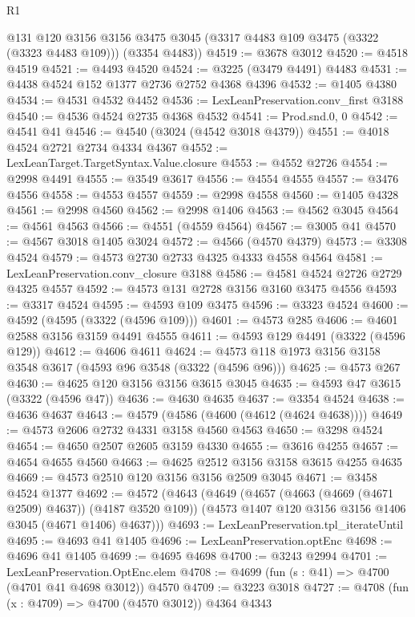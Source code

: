 \begin{lexlean}{R1}
\begin{coremodule}
      @131
      @120
      @3156
      @3156
      @3475
      @3045
      (@3317 @4483 @109 @3475 (@3322 (@3323 @4483 @109)))
      (@3354 @4483))
@4519 := @3678 @3012
@4520 := @4518 @4519
@4521 := @4493 @4520
@4524 := @3225 (@3479 @4491) @4483
@4531 := @4438 @4524 @152 @1377 @2736 @2752 @4368 @4396
@4532 := @1405 @4380
@4534 := @4531 @4532 @4452
@4536 := LexLeanPreservation.conv_first @3188
@4540 := @4536 @4524 @2735 @4368 @4532
@4541 := Prod.snd.{0, 0}
@4542 := @4541 @41
@4546 := @4540 (@3024 (@4542 @3018 @4379))
@4551 := @4018 @4524 @2721 @2734 @4334 @4367
@4552 := LexLeanTarget.TargetSyntax.Value.closure
@4553 := @4552 @2726
@4554 := @2998 @4491
@4555 := @3549 @3617
@4556 := @4554 @4555
@4557 := @3476 @4556
@4558 := @4553 @4557
@4559 := @2998 @4558
@4560 := @1405 @4328
@4561 := @2998 @4560
@4562 := @2998 @1406
@4563 := @4562 @3045
@4564 := @4561 @4563
@4566 := @4551 (@4559 @4564)
@4567 := @3005 @41
@4570 := @4567 @3018 @1405 @3024
@4572 := @4566 (@4570 @4379)
@4573 := @3308 @4524
@4579 := @4573 @2730 @2733 @4325 @4333 @4558 @4564
@4581 := LexLeanPreservation.conv_closure @3188
@4586 := @4581 @4524 @2726 @2729 @4325 @4557
@4592 := @4573 @131 @2728 @3156 @3160 @3475 @4556
@4593 := @3317 @4524
@4595 := @4593 @109 @3475
@4596 := @3323 @4524
@4600 := @4592 (@4595 (@3322 (@4596 @109)))
@4601 := @4573 @285
@4606 := @4601 @2588 @3156 @3159 @4491 @4555
@4611 := @4593 @129 @4491 (@3322 (@4596 @129))
@4612 := @4606 @4611
@4624 := @4573 @118 @1973 @3156 @3158 @3548 @3617 (@4593 @96 @3548 (@3322 (@4596 @96)))
@4625 := @4573 @267
@4630 := @4625 @120 @3156 @3156 @3615 @3045
@4635 := @4593 @47 @3615 (@3322 (@4596 @47))
@4636 := @4630 @4635
@4637 := @3354 @4524
@4638 := @4636 @4637
@4643 := @4579 (@4586 (@4600 (@4612 (@4624 @4638))))
@4649 := @4573 @2606 @2732 @4331 @3158 @4560 @4563
@4650 := @3298 @4524
@4654 := @4650 @2507 @2605 @3159 @4330
@4655 := @3616 @4255
@4657 := @4654 @4655 @4560
@4663 := @4625 @2512 @3156 @3158 @3615 @4255 @4635
@4669 := @4573 @2510 @120 @3156 @3156 @2509 @3045
@4671 := @3458 @4524 @1377
@4692 := @4572
    (@4643
      (@4649
        (@4657 (@4663 (@4669 (@4671 @2509) @4637)) (@4187 @3520 @109))
        (@4573 @1407 @120 @3156 @3156 @1406 @3045 (@4671 @1406) @4637)))
@4693 := LexLeanPreservation.tpl_iterateUntil
@4695 := @4693 @41 @1405
@4696 := LexLeanPreservation.optEnc
@4698 := @4696 @41 @1405
@4699 := @4695 @4698
@4700 := @3243 @2994
@4701 := LexLeanPreservation.OptEnc.elem
@4708 := @4699 (fun (s : @41) => @4700 (@4701 @41 @4698 @3012)) @4570
@4709 := @3223 @3018
@4727 := @4708
    (fun (x : @4709) => @4700 (@4570 @3012))
    @4364
    @4343

\end{coremodule}
\end{lexlean}
